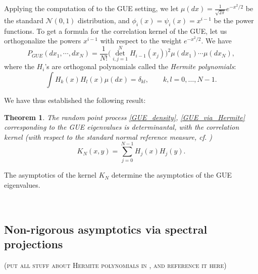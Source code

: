 \documentclass[letterpaper,11pt,oneside,reqno]{amsart}
\numberwithin{equation}{section}
\newcommand{\note}[1]{\textsc{\color{blue}(#1)}}
\newcommand{\lect}[1]{}
\newcommand{\Det}{\mathop{\mathrm{det}}\limits}
\newtheorem{theorem}[proposition]{Theorem}
\theoremstyle{definition}
\begin{document}
Applying the computation of 
to the GUE setting, we let 
$\mu(dx)=\frac{1}{\sqrt{2\pi}}e^{-x^2/2}$ be the standard $\mathcal{N}(0,1)$ distribution,
and $\phi_i(x)=\psi_i(x)=x^{i-1}$ be the power functions. 
To get a formula for the correlation
kernel of the GUE, let us orthogonalize the powers $x^{i-1}$ with respect to the weight $e^{-x^2/2}$. We have
\begin{equation}\label{GUE_via_Hermite}
  P_{GUE}(dx_1,\cdots, dx_N)=
  \frac{1}{N!}
  \Big(\Det_{i,j=1}^{N}H_{i-1}(x_j)\Big)^2 \mu(dx_1)\cdots\mu(dx_N),
\end{equation}
where the $H_i$'s are orthogonal polynomials called the \emph{Hermite polynomials}:
\begin{equation*}
  \int H_k(x) H_l(x) \mu(dx)=\delta_{kl},\qquad k,l=0,\ldots,N-1.
\end{equation*}

We have thus established the following result:
\begin{theorem}\label{thm:GUE_kernel}
	The random point process \eqref{GUE_density}, \eqref{GUE_via_Hermite}
	corresponding to the GUE eigenvalues is determinantal, with the correlation
	kernel (with respect to the standard normal
	reference measure, cf. )
	\begin{equation}
		K_N(x,y)=\sum_{j=0}^{N-1}H_j(x)H_j(y).
	\end{equation}
\end{theorem}

The asymptotics of the kernel $K_N$ determine the asymptotics of the GUE eigenvalues.



{\ }\\\lect{2/17/2016}

\subsection{Non-rigorous asymptotics via spectral projections} %
\label{sub:non_rigorous_asymptotics_using_operator_approach}

\note{put all stuff about Hermite polynomials in \Cref{sub:hermite_polynomials}, and reference it here}


{\ }\\\lect{3/14/2016}
\end{document}
